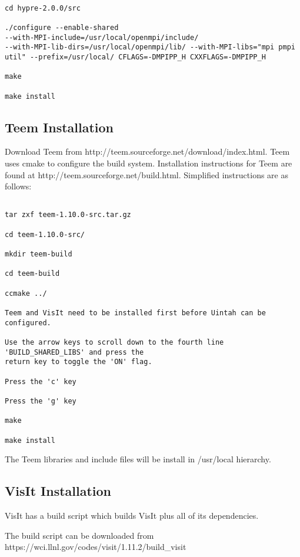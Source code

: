 \begin{Verbatim}

cd hypre-2.0.0/src

./configure --enable-shared
--with-MPI-include=/usr/local/openmpi/include/
--with-MPI-lib-dirs=/usr/local/openmpi/lib/ --with-MPI-libs="mpi pmpi
util" --prefix=/usr/local/ CFLAGS=-DMPIPP_H CXXFLAGS=-DMPIPP_H

make

make install

\end{Verbatim}

 

\subsection{Teem Installation}

Download Teem from http://teem.sourceforge.net/download/index.html.  Teem uses cmake to configure the build system. Installation instructions for Teem are found at http://teem.sourceforge.net/build.html.  Simplified instructions are as follows:

\begin{verbatim}

tar zxf teem-1.10.0-src.tar.gz

cd teem-1.10.0-src/

mkdir teem-build

cd teem-build

ccmake ../

Teem and VisIt need to be installed first before Uintah can be configured.

Use the arrow keys to scroll down to the fourth line 'BUILD_SHARED_LIBS' and press the 
return key to toggle the 'ON' flag.

Press the 'c' key

Press the 'g' key

make

make install

\end{verbatim}

The Teem libraries and include files will be install in /usr/local hierarchy.


\subsection{VisIt Installation}
VisIt has a build script which builds VisIt plus all of its dependencies.

The build script can be downloaded from
https://wci.llnl.gov/codes/visit/1.11.2/build\_visit


